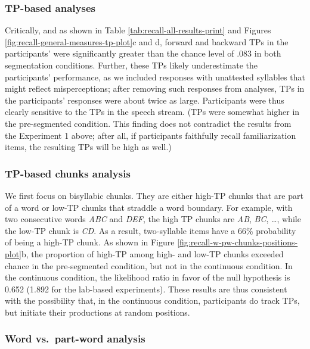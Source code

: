 \documentclass[
]{article}
\begin{document}
\hypertarget{tp-based-analyses}{%
\subsubsection{TP-based analyses}\label{tp-based-analyses}}

Critically, and as shown in Table \ref{tab:recall-all-results-print} and
Figures \ref{fig:recall-general-measures-tp-plot}c and d, forward and
backward TPs in the participants' were significantly greater than the
chance level of \(.083\) in both segmentation conditions. Further, these
TPs likely underestimate the participants' performance, as we included
responses with unattested syllables that might reflect misperceptions;
after removing such responses from analyses, TPs in the participants'
responses were about twice as large. Participants were thus clearly
sensitive to the TPs in the speech stream. (TPs were somewhat higher in
the pre-segmented condition. This finding does not contradict the
results from the Experiment 1 above; after all, if participants
faithfully recall familiarization items, the resulting TPs will be high
as well.)

\hypertarget{tp-based-chunks-analysis}{%
\subsubsection{TP-based chunks
analysis}\label{tp-based-chunks-analysis}}

We first focus on bisyllabic chunks. They are either high-TP chunks that
are part of a word or low-TP chunks that straddle a word boundary. For
example, with two consecutive words \emph{ABC} and \emph{DEF}, the high
TP chunks are \emph{AB}, \emph{BC}, \ldots, while the low-TP chunk is
\emph{CD}. As a result, two-syllable items have a 66\% probability of
being a high-TP chunk. As shown in Figure
\ref{fig:recall-w-pw-chunks-positions-plot}b, the proportion of high-TP
among high- and low-TP chunks exceeded chance in the pre-segmented
condition, but not in the continuous condition. In the continuous
condition, the likelihood ratio in favor of the null hypothesis is 0.652
(1.892 for the lab-based experiments). These results are thus consistent
with the possibility that, in the continuous condition, participants do
track TPs, but initiate their productions at random positions.

\hypertarget{word-vs.-part-word-analysis}{%
\subsubsection{Word vs.~part-word
analysis}\label{word-vs.-part-word-analysis}}
\end{document}
